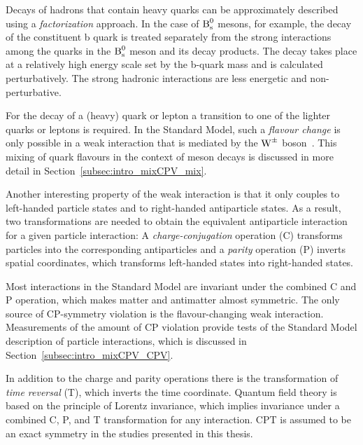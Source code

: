 Decays of hadrons that contain heavy quarks can be approximately described using a \emph{factorization} approach. In the case of $\Bs$
mesons, for example, the decay of the constituent b quark is treated separately from the strong interactions among the quarks in the $\Bs$
meson and its decay products. The decay takes place at a relatively high energy scale set by the b-quark mass and is calculated
perturbatively. The strong hadronic interactions are less energetic and non-perturbative.

For the decay of a (heavy) quark or lepton a transition to one of the lighter quarks or leptons is required. In the Standard Model, such a
\emph{flavour change} is only possible in a weak interaction that is mediated by the $\Wpm$
boson~\cite{Cabibbo:1963yz,Glashow:1970gm,Kobayashi:1973fv}. This mixing of quark flavours in the context of meson decays is discussed in
more detail in Section~\ref{subsec:intro_mixCPV_mix}.


Another interesting property of the weak interaction is that it only couples to left-handed particle states and to right-handed
antiparticle states. As a result, two transformations are needed to obtain the equivalent antiparticle interaction for a given particle
interaction: A \emph{charge-conjugation} operation (C) transforms particles into the corresponding antiparticles and a \emph{parity}
operation (P) inverts spatial coordinates, which transforms left-handed states into right-handed states.

Most interactions in the Standard Model are invariant under the combined C and P operation, which makes matter and antimatter almost
symmetric. The only source of CP-symmetry violation is the flavour-changing weak interaction. Measurements of the amount of CP violation
provide tests of the Standard Model description of particle interactions, which is discussed in Section~\ref{subsec:intro_mixCPV_CPV}.

In addition to the charge and parity operations there is the transformation of \emph{time reversal} (T), which inverts the time coordinate.
Quantum field theory is based on the principle of Lorentz invariance, which implies invariance under a combined C, P, and T transformation
for any interaction. CPT is assumed to be an exact symmetry in the studies presented in this thesis.


